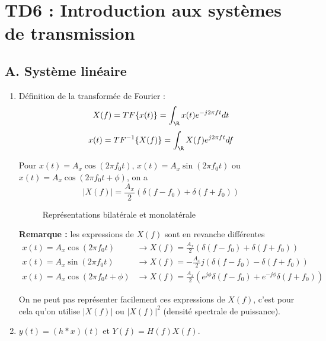 \documentclass[../../Cours_M1.tex]{subfiles}
\newcommand{\nomTD}{TD6 : Introduction aux systèmes de transmission}
\begin{document}
\section*{\nomTD}

\subsection*{A. Système linéaire}

\begin{enumerate}\setlength{\itemsep}{10mm}
\item Définition de la transformée de Fourier :
\[X(f) = TF\{x(t)\} = \int_{\R} x(t) e^{-j2\pi ft} dt \]
\[x(t) = TF^{-1}\{X(f)\} = \int_{\R} X(f) e^{j2\pi ft} df \]

Pour $x(t) = A_x\cos(2\pi f_0 t)$, $x(t) = A_x\sin(2\pi f_0 t)$ ou $x(t) = A_x\cos(2\pi f_0 t + \phi)$, on a 
\[|X(f)| = \frac{A_x}{2}(\delta(f-f_0)+\delta(f+f_0))\]

\begin{figure}[h!]
\centering
{}
\caption{Représentations bilatérale et monolatérale}
\end{figure}

\textbf{Remarque :} les expressions de $X(f)$ sont en revanche différentes
\begin{align*}
x(t) = A_x\cos(2\pi f_0 t) & \rightarrow X(f) = \frac{A_x}{2}(\delta(f-f_0)+\delta(f+f_0)) \\
x(t) = A_x\sin(2\pi f_0 t) & \rightarrow X(f) = -\frac{A_x}{2}j(\delta(f-f_0)-\delta(f+f_0)) \\
x(t) = A_x\cos(2\pi f_0 t + \phi) & \rightarrow X(f) = \frac{A_x}{2}(e^{j\phi}\delta(f-f_0)+e^{-j\phi}\delta(f+f_0))
\end{align*}

On ne peut pas représenter facilement ces expressions de $X(f)$, c'est pour cela qu'on utilise $|X(f)|$ ou $|X(f)|^2$ (densité spectrale de puissance).

\item $y(t) = (h*x)(t)$ et $Y(f) = H(f) X(f)$.
\end{enumerate}
\end{document}
